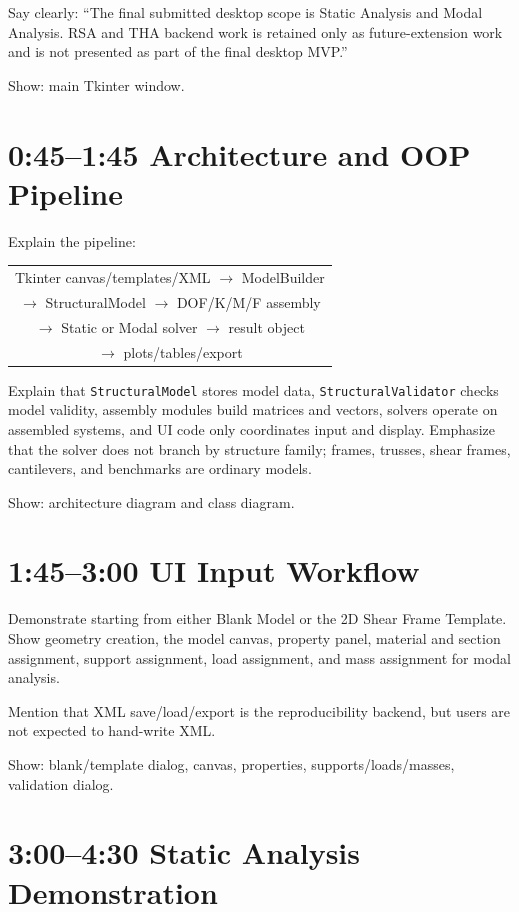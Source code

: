 \documentclass[11pt,a4paper]{article}
\begin{document}
Say clearly: ``The final submitted desktop scope is Static Analysis and Modal Analysis. RSA and THA backend work is retained only as future-extension work and is not presented as part of the final desktop MVP.''

Show: main Tkinter window.

\section{0:45--1:45 Architecture and OOP Pipeline}

Explain the pipeline:
\begin{center}
\begin{tabular}{c}
Tkinter canvas/templates/XML \(\rightarrow\) ModelBuilder \\
\(\rightarrow\) StructuralModel \(\rightarrow\) DOF/K/M/F assembly \\
\(\rightarrow\) Static or Modal solver \(\rightarrow\) result object \\
\(\rightarrow\) plots/tables/export
\end{tabular}
\end{center}

Explain that \texttt{StructuralModel} stores model data, \texttt{StructuralValidator} checks model validity, assembly modules build matrices and vectors, solvers operate on assembled systems, and UI code only coordinates input and display. Emphasize that the solver does not branch by structure family; frames, trusses, shear frames, cantilevers, and benchmarks are ordinary models.

Show: architecture diagram and class diagram.

\section{1:45--3:00 UI Input Workflow}

Demonstrate starting from either Blank Model or the 2D Shear Frame Template. Show geometry creation, the model canvas, property panel, material and section assignment, support assignment, load assignment, and mass assignment for modal analysis.

Mention that XML save/load/export is the reproducibility backend, but users are not expected to hand-write XML.

Show: blank/template dialog, canvas, properties, supports/loads/masses, validation dialog.

\section{3:00--4:30 Static Analysis Demonstration}
\end{document}
